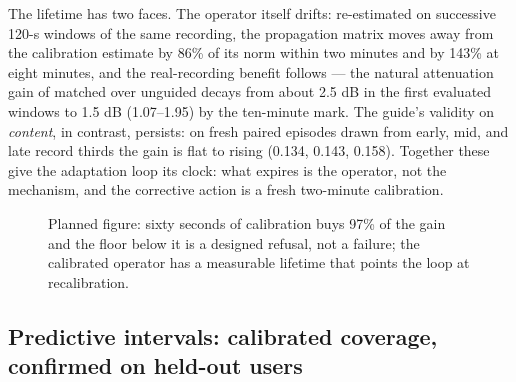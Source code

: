 The lifetime has two faces. The operator itself drifts: re-estimated on successive 120-s windows of the same recording, the propagation matrix moves away from the calibration estimate by 86\% of its norm within two minutes and by 143\% at eight minutes, and the real-recording benefit follows --- the natural attenuation gain of matched over unguided decays from about 2.5 dB in the first evaluated windows to 1.5 dB (1.07--1.95) by the ten-minute mark. The guide's validity on \emph{content}, in contrast, persists: on fresh paired episodes drawn from early, mid, and late record thirds the gain is flat to rising (0.134, 0.143, 0.158). Together these give the adaptation loop its clock: what expires is the operator, not the mechanism, and the corrective action is a fresh two-minute calibration.

\begin{figure}[t]
  \centering
  \caption{Planned figure: sixty seconds of calibration buys 97\% of the gain and the floor below it is a designed refusal, not a failure; the calibrated operator has a measurable lifetime that points the loop at recalibration.}
  \label{fig:loop}
\end{figure}

\subsection{Predictive intervals: calibrated coverage, confirmed on held-out users}
\label{sec:res-uq}

